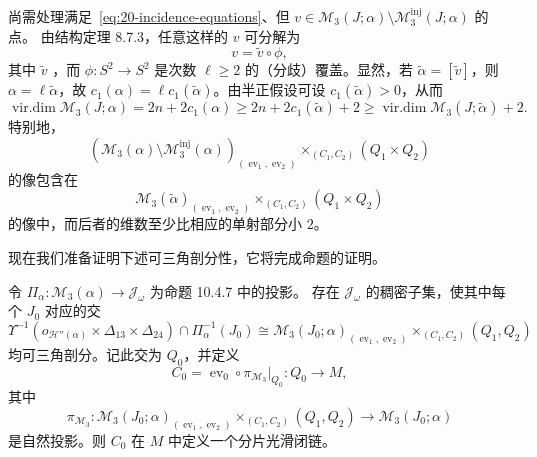 尚需处理满足~\eqref{eq:20-incidence-equations}、但
$v\in\mathcal M_3(J;\alpha)\setminus\mathcal M_3^{\mathrm{inj}}(J;\alpha)$ 的点。
由结构定理 8.7.3，任意这样的 $v$ 可分解为
\[
 v=\widetilde v\circ\phi,
\]
其中 $\widetilde v$ \termSomewhereInjective{}，而 $\phi:S^2\to S^2$ 是次数
$\ell\geq2$ 的（分歧）覆盖。显然，若
$\widetilde\alpha=[\widetilde v]$，则
$\alpha=\ell\widetilde\alpha$，故
$c_1(\alpha)=\ell c_1(\widetilde\alpha)$。由半正假设可设
$c_1(\widetilde\alpha)>0$，从而
\begin{equation}
 \operatorname{vir.dim}\mathcal M_3(J;\alpha)=2n+2c_1(\alpha)
 \geq2n+2c_1(\widetilde\alpha)+2
 \geq\operatorname{vir.dim}\mathcal M_3(J;\widetilde\alpha)+2.
 \label{eq:20-multiple-cover-codimension}
\end{equation}
特别地，
\[
 (\mathcal M_3(\alpha)\setminus\mathcal M_3^{\mathrm{inj}}(\alpha))
 _{(\operatorname{ev}_1,\operatorname{ev}_2)}\times_{(C_1,C_2)}(Q_1\times Q_2)
\]
的像包含在
\[
 \mathcal M_3(\widetilde\alpha)_{(\operatorname{ev}_1,\operatorname{ev}_2)}
 \times_{(C_1,C_2)}(Q_1\times Q_2)
\]
的像中，而后者的维数至少比相应的单射部分小 $2$。

现在我们准备证明下述可三角剖分性，它将完成命题的证明。

\begin{lemma}
\label{lem:20-triangulability}
令 $\Pi_\alpha:\mathcal M_3(\alpha)\to\mathcal J_\omega$ 为命题 10.4.7 中的投影。
存在 $\mathcal J_\omega$ 的稠密子集，使其中每个 $J_0$ 对应的交
\[
 \Upsilon^{-1}(o_{\mathcal H''(\alpha)}\times\Delta_{13}\times\Delta_{24})
 \cap\Pi_\alpha^{-1}(J_0)
 \cong\mathcal M_3(J_0;\alpha)_{(\operatorname{ev}_1,\operatorname{ev}_2)}
 \times_{(C_1,C_2)}(Q_1,Q_2)
\]
均可三角剖分。记此交为 $Q_0$，并定义
\[
 C_0=\operatorname{ev}_0\circ\pi_{\mathcal M_3}|_{Q_0}:Q_0\to M,
\]
其中
\[
 \pi_{\mathcal M_3}:\mathcal M_3(J_0;\alpha)_{(\operatorname{ev}_1,\operatorname{ev}_2)}
 \times_{(C_1,C_2)}(Q_1,Q_2)\to\mathcal M_3(J_0;\alpha)
\]
是自然投影。则 $C_0$ 在 $M$ 中定义一个分片光滑闭链。
\end{lemma}

